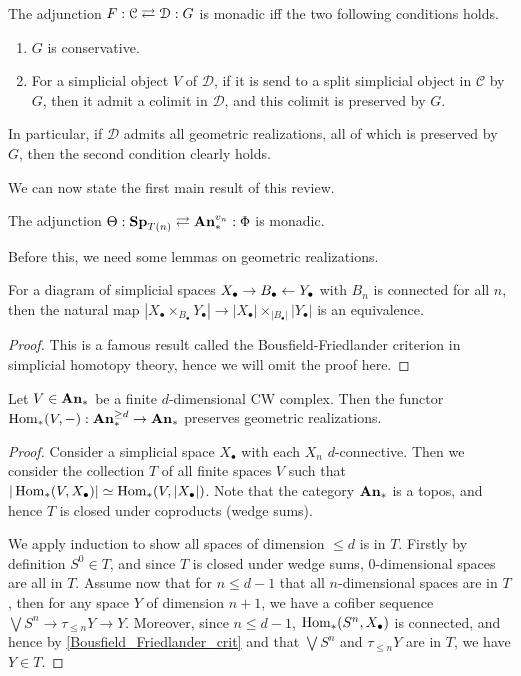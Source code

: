 	\begin{thm}\label{Barr_Beck_Lurie}
		The adjunction $F:\mathcal{C}\rightleftarrows\mathcal{D}:G$ is monadic iff the two following conditions holds. 
		\begin{enumerate}
			\item $G$ is conservative. 
			\item For a simplicial object $V$ of $\mathcal{D}$, if it is send to a split simplicial object in $\mathcal{C}$ by $G$, then it admit a colimit in $\mathcal{D}$, and this colimit is preserved by $G$. 
		\end{enumerate}
		In particular, if $\mathcal{D}$ admits all geometric realizations, all of which is preserved by $G$, then the second condition clearly holds. 
	\end{thm}

	We can now state the first main result of this review. 

	\begin{thm}\label{Monadicity_Bousfield_Kuhn}
		The adjunction $\Theta:\mathbf{Sp}_{T(n)}\rightleftarrows\mathbf{An}_*^{v_n}:\Phi$ is monadic. 
	\end{thm}

	Before this, we need some lemmas on geometric realizations. 

	\begin{lemma}\label{Bousfield_Friedlander_crit}
		For a diagram of simplicial spaces $X_\bullet\to B_\bullet\leftarrow Y_\bullet$ with $B_n$ is connected for all $n$, then the natural map $|X_\bullet\times_{B_\bullet}Y_\bullet|\to|X_\bullet|\times_{|B_\bullet|}|Y_\bullet|$ is an equivalence. 
	\end{lemma}
	\begin{proof}
		This is a famous result called the Bousfield-Friedlander criterion in simplicial homotopy theory, hence we will omit the proof here. 
	\end{proof}

	\begin{lemma}\label{Hom_geom_realization}
		Let $V\in\mathbf{An}_*$ be a finite $d$-dimensional CW complex. Then the functor $\operatorname{\mathrm{Hom}}_*(V,-):\mathbf{An}_*^{\geq d}\to\mathbf{An}_*$ preserves geometric realizations. 
	\end{lemma}
	\begin{proof}
		Consider a simplicial space $X_\bullet$ with each $X_n$ $d$-connective. Then we consider the collection $T$ of all finite spaces $V$ such that $|\operatorname{\mathrm{Hom}}_*(V,X_\bullet)|\simeq\operatorname{\mathrm{Hom}}_*(V,|X_\bullet|)$. Note that the category $\mathbf{An}_*$ is a topos, and hence $T$ is closed under coproducts (wedge sums). 

		We apply induction to show all spaces of dimension $\leq d$ is in $T$. Firstly by definition $S^0\in T$, and since $T$ is closed under wedge sums, $0$-dimensional spaces are all in $T$. Assume now that for $n\leq d-1$ that all $n$-dimensional spaces are in $T$, then for any space $Y$ of dimension $n+1$, we have a cofiber sequence $\bigvee S^n\to\tau_{\leq n}Y\to Y$. Moreover, since $n\leq d-1$, $\operatorname{\mathrm{Hom}}_*(S^n,X_\bullet)$ is connected, and hence by \cref{Bousfield_Friedlander_crit} and that $\bigvee S^n$ and $\tau_{\leq n}Y$ are in $T$, we have $Y\in T$. 
	\end{proof}

